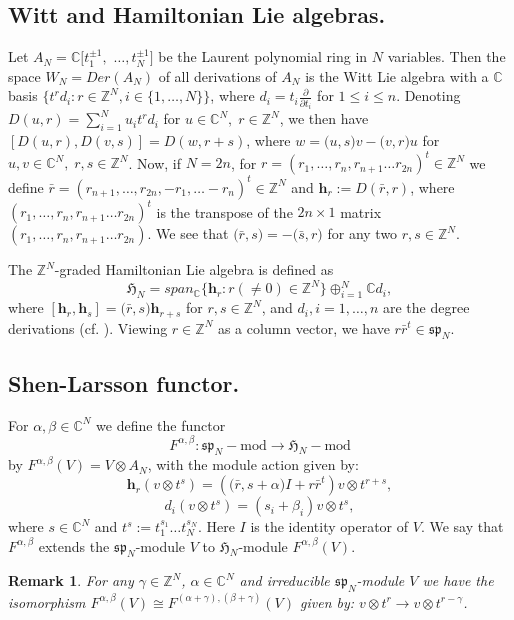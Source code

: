 \documentclass[a4paper,11pt]{amsart}
\numberwithin{equation}{section}
\theoremstyle{plain}
\newtheorem{remark}[theorem]{Remark}
\newcommand{\Z}{\mathbb{Z}}
\newcommand{\C}{\mathbb{C}}
\newcommand{\s}{\mathfrak{sp}_{N}}
\newcommand{\Ha}{\mathfrak{H}_{N}}
\renewcommand{\H}{\mathbf{h}}
\begin{document}
  

\subsection{Witt  and Hamiltonian Lie algebras.}
 Let $A_N=\C[t_1^{\pm 1},$
$\dots, t_N^{\pm 1}]$ be the Laurent polynomial ring in $N$ variables. Then the space $W_N=Der(A_N)$ of all derivations of $A_N$  is the Witt Lie algebra with a $\C$ basis $\{t^rd_i:r\in \Z^N,i\in \{1,\dots,N \}\}$, where $d_i=t_i\frac{\partial}{\partial t_i}$ for $1\leq i\leq n$. Denoting $D(u,r)=\sum_{i=1}^Nu_it^rd_i$ for $u\in \C^N,\; r\in \Z^N$, we then have $[D(u,r),D(v,s)]=D(w,r+s)$, where $w=\bm{(}u,s\bm{)}v-\bm{(}v,r\bm{)}u$ for $u,v\in \C^N,\; r,s\in \Z^N$. Now, if $N=2n$, for $r=(r_1,\dots,r_n,r_{n+1}\dots r_{2n})^t\in \Z^N$ we define $\bar{r}=(r_{n+1},\dots, r_{2n},-r_1,\dots -r_{n})^t\in \Z^N$ and $\H_r:=D(\bar{r},r)$, where $(r_1,\dots,r_n,r_{n+1}\dots r_{2n})^t$ is the transpose of the $2n\times1$ matrix $(r_1,\dots,r_n,r_{n+1}\dots r_{2n})$. We see that $\bm{(}\bar{r},s\bm{)}=-\bm{(}\bar{s},r\bm{)}$ for any two $r,s\in \Z^N$. 

The $\Z^N$-graded Hamiltonian Lie algebra is defined as
$$\Ha=span_\C \{\H_r: r (\neq 0)\in \Z^N  \} \oplus_{i=1}^N \C d_i,$$ where $[\H_r,\H_s]=\bm{(}\bar{r},s\bm{)}\H_{r+s}$ for $r,s\in \Z^N$, and $d_i, i=1, \ldots, n$ are the degree derivations (cf. \cite{R23}). Viewing $r\in \Z^N$ as a column vector, we have $r\bar{r}^t\in \s$. 

\subsection{Shen-Larsson functor.}
For $\alpha,\beta \in \C^N$ we define the functor
$$F^{\alpha,\beta }:\s-\text{mod}\rightarrow \Ha-\text{mod}$$ by $ F^{\alpha,\beta }(V)=V\otimes A_N$, with the module action given by:
\begin{equation}
    \H_r(v\otimes t^s)=(\bm{(}\bar{r},s+\alpha\bm{)}I+r\bar{r}^t)v\otimes t^{r+s}, \end{equation}
    \begin{equation}
    d_i(v\otimes t^s)=(s_i+\beta_i)v\otimes t^s,
\end{equation}
where $s\in \C^N$ and $t^s:=t_1^{s_1}\ldots t_N^{s_N}$.
Here $I$ is the identity operator of $V$. We say that $F^{\alpha,\beta}$ extends the $\s$-module $V$ to $\Ha$-module $F^{\alpha,\beta}(V)$. 

\begin{remark}\label{Rmk1}
     For any $\gamma\in \Z^N$, $\alpha\in \C^N$ and irreducible $\s$-module $V$ we have the isomorphism $F^{\alpha,\beta}(V)\cong F^{(\alpha+\gamma),(\beta+\gamma)}(V)$ given by: $v\otimes t^r\rightarrow v\otimes t^{r-\gamma}$. 
 \end{remark} 
\end{document}
